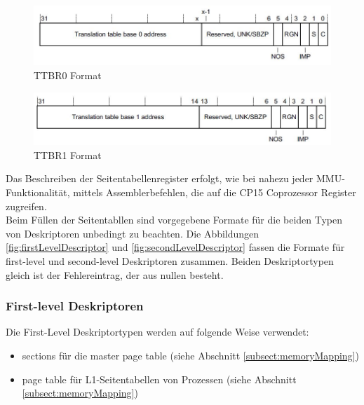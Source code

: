 \begin{figure}[H]
	\includegraphics[scale=0.8]{figures/ttbr0format}
	\caption{TTBR0 Format \cite[S. B4-1726]{ARM:ARM}}
	\label{fig:TTBR0Format}
\end{figure}


\begin{figure}[H]
	\includegraphics[scale=0.8]{figures/ttbr1format}
	\caption{TTBR1 Format \cite[S. B4-1730]{ARM:ARM}}
	\label{fig:TTBR1Format}
\end{figure}

Das Beschreiben der Seitentabellenregister erfolgt, wie bei nahezu jeder MMU-Funktionalität, mittels Assemblerbefehlen, die auf die CP15 Coprozessor Register zugreifen.\\

Beim Füllen der Seitentabllen sind vorgegebene Formate für die beiden Typen von Deskriptoren unbedingt zu beachten. Die Abbildungen \ref{fig:firstLevelDescriptor} und \ref{fig:secondLevelDescriptor} fassen die Formate für first-level und second-level Deskriptoren zusammen. Beiden Deskriptortypen gleich ist der Fehlereintrag, der aus nullen besteht.\\

\subsubsection*{First-level Deskriptoren}

Die First-Level Deskriptortypen werden auf folgende Weise verwendet:

\begin{itemize}
	\item sections für die master page table (siehe Abschnitt \ref{subsect:memoryMapping}) 
	\item page table für L1-Seitentabellen von Prozessen (siehe Abschnitt \ref{subsect:memoryMapping})
\end{itemize}


